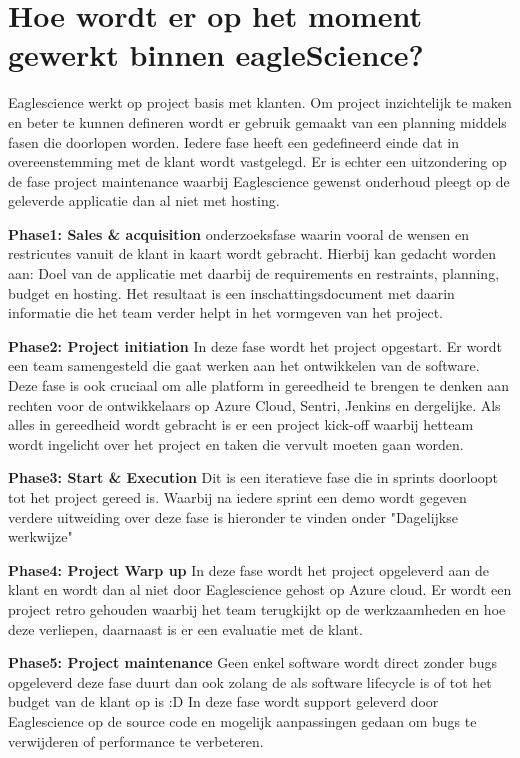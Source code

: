 \section{Hoe wordt er op het moment gewerkt binnen eagleScience?}\label{sec:hoe-wordt-er-op-het-moment-gewerkt-binnen-eaglescience?}
Eaglescience werkt op project basis met klanten.
Om project inzichtelijk te maken en beter te kunnen defineren wordt er gebruik gemaakt van een planning middels fasen die doorlopen worden.
Iedere fase heeft een gedefineerd einde dat in overeenstemming met de klant wordt vastgelegd.
Er is echter een uitzondering op de fase project maintenance waarbij Eaglescience gewenst onderhoud pleegt op de geleverde applicatie dan al niet met hosting.
\medskip

\textbf{Phase1: Sales \& acquisition}
onderzoeksfase waarin vooral de wensen en restricutes vanuit de klant in kaart wordt gebracht.
Hierbij kan gedacht worden aan: Doel van de applicatie met daarbij de requirements en restraints, planning, budget en hosting.
Het resultaat is een inschattingsdocument met daarin informatie die het team verder helpt in het vormgeven van het project.

\textbf{Phase2: Project initiation}
In deze fase wordt het project opgestart.
Er wordt een team samengesteld die gaat werken aan het ontwikkelen van de software.
Deze fase is ook cruciaal om alle platform in gereedheid te brengen te denken aan rechten voor de ontwikkelaars op Azure Cloud, Sentri, Jenkins en dergelijke.
Als alles in gereedheid wordt gebracht is er een project kick-off waarbij hetteam wordt ingelicht over het project en taken die vervult moeten gaan worden.

\textbf{Phase3: Start \& Execution}
Dit is een iteratieve fase die in sprints doorloopt tot het project gereed is.
Waarbij na iedere sprint een demo wordt gegeven verdere uitweiding over deze fase is hieronder te vinden onder "Dagelijkse werkwijze"

\textbf{Phase4: Project Warp up}
In deze fase wordt het project opgeleverd aan de klant en wordt dan al niet door Eaglescience gehost op Azure cloud.
Er wordt een project retro gehouden waarbij het team terugkijkt op de werkzaamheden en hoe deze verliepen, daarnaast is er een evaluatie met de klant.

\textbf{Phase5: Project maintenance}
Geen enkel software wordt direct zonder bugs opgeleverd deze fase duurt dan ook zolang de als software lifecycle is of tot het budget van de klant op is :D In deze fase wordt support geleverd door Eaglescience op de source code en mogelijk aanpassingen gedaan om bugs te verwijderen of performance te verbeteren.

